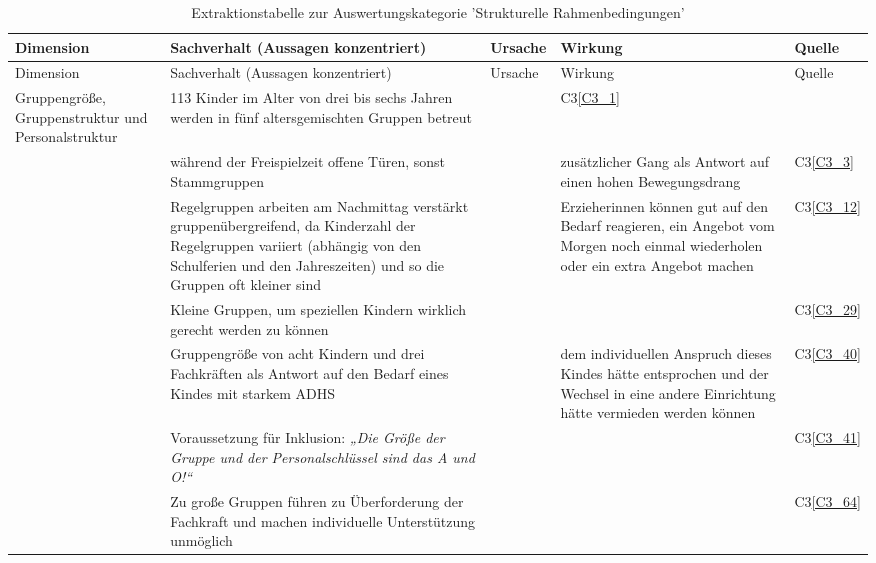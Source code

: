 \begin{landscape}
\begin{small}

\begin{centering}
\begin{longtable}{p{2.2cm}p{8cm}p{6cm}p{3cm}p{2cm}} 
\caption{Extraktionstabelle zur Auswertungskategorie 'Strukturelle Rahmenbedingungen'}\\
\toprule
Dimension & Sachverhalt (Aussagen konzentriert) & Ursache & Wirkung & Quelle\\
\midrule
\endfirsthead
\toprule
Dimension & Sachverhalt (Aussagen konzentriert) & Ursache & Wirkung & Quelle\\
\midrule
\endhead
\bottomrule
\endfoot
Gruppengröße, Gruppenstruktur und Personalstruktur & 113 Kinder im Alter von drei bis sechs Jahren werden in fünf altersgemischten Gruppen betreut  & & C3\ref{C3_1}\\

  & während der Freispielzeit offene Türen, sonst Stammgruppen &  &  zusätzlicher Gang als Antwort auf einen hohen Bewegungsdrang & C3\ref{C3_3}\\
  
 & Regelgruppen arbeiten am Nachmittag verstärkt gruppenübergreifend, da Kinderzahl der Regelgruppen variiert (abhängig von den Schulferien und den Jahreszeiten) und so die Gruppen oft kleiner sind & & Erzieherinnen können gut auf den Bedarf reagieren, ein Angebot vom Morgen noch einmal wiederholen oder ein extra Angebot machen & C3\ref{C3_12}\\
 
 & Kleine Gruppen, um speziellen Kindern wirklich gerecht werden zu können & & & C3\ref{C3_29}\\
  
 & Gruppengröße von acht Kindern und drei Fachkräften als Antwort auf den Bedarf eines Kindes mit starkem ADHS & & dem individuellen Anspruch dieses Kindes hätte entsprochen und der Wechsel in eine andere Einrichtung hätte vermieden werden können & C3\ref{C3_40}\\
 
 & Voraussetzung für Inklusion: 
\emph{„Die Größe der Gruppe und der Personalschlüssel sind das A und O!“} & & & C3\ref{C3_41}\\

 & Zu große Gruppen führen zu Überforderung der Fachkraft und machen individuelle Unterstützung unmöglich & & & C3\ref{C3_64}\\


\end{longtable}
\end{centering}
\end{small}
\end{landscape}
